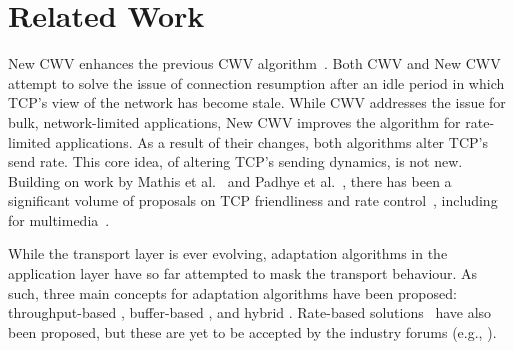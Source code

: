\documentclass[10pt,sigconf,anonymous]{acmart}
\begin{document}

\section{Related Work}
\label{sec:related}

New CWV enhances the previous CWV algorithm~\cite{rfc2861-2000-padhye-congestion-window-validation}. Both CWV and New CWV attempt to solve the issue of connection resumption after an idle period in which TCP's view of the network has become stale. While CWV addresses the issue for bulk, network-limited applications, New CWV improves the algorithm for rate-limited applications. As a result of their changes, both algorithms alter TCP's send rate. This core idea, of altering TCP's sending dynamics, is not new. Building on work by Mathis et al.~\cite{Mathis-1997-the-macroscopic-behavior-tcp} and Padhye et al.~\cite{Padhye-1998-modelling-tcp-throughput}, there has been a significant volume of proposals on TCP friendliness and rate control~\cite{rfc-5348-tfrc,Rossi-2010-ledbat,Arun-2018-copa}, including for multimedia~\cite{Carlucci-2016-Analysis-WebRTC,Choi-2007-fairer-tfrc}.

While the transport layer is ever evolving, adaptation algorithms in the application layer have so far attempted to mask the transport behaviour. As such, three main concepts for adaptation algorithms have been proposed: throughput-based \cite{Sun-2016-cs2p, Jiang-2012-improving-fairness-http-video-festive}, buffer-based \cite{Spiteri-2016-BOLA,Huang-2015-A-buffer-based-approach-to-rate-adaptation-bba}, and hybrid \cite{Spiteri-2019-from-theory-to-practice-sabre,Wang-2016-squad}. Rate-based solutions~\cite{Li-2014-probe-and-adapt-panda,Liu-2011-rate-adaptation} have also been proposed, but these are yet to be accepted by the industry forums (e.g., \cite{online-dashif}).
\end{document}
